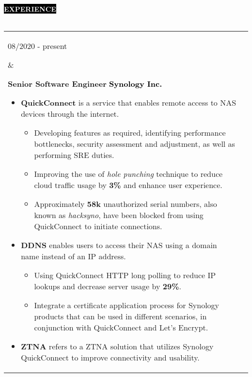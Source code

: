 \documentclass[10pt,A4]{article}
\makeatletter
\newcounter{a}
\newcounter{b}
\newcounter{c}
\newcommand{\cvsection}[1] {
	\textcolor{white}{\MakeUppercase{\textbf{#1}}}
}
\newcommand{\cvsect}[1]{
	\colorbox{black}{{\cvsection{#1}}}\\\\%
}
\newenvironment{entrylist}{%
	\begin{tabular*}{\textwidth}[t]{@{\extracolsep{\fill}}ll}
	}{%
	\end{tabular*}
}
\newcommand{\entry}[4]{%
	\parbox[t]{3.5cm}{%
		#1%
	}%
	&\parbox[t]{14cm}{%
		\textbf{#2}%
		\hfill%
		{\footnotesize \textbf{\textcolor{black}{#3}}}\\%
		#4%
	}\\\\}
\makeatother
\begin{document}
	\cvsect{Experience}\nobreak
	\begin{entrylist}
		\entry
		{08/2020 - present}
		{Senior Software Engineer}
		{Synology Inc.}
		{
				\begin{itemize}[leftmargin=*]
					\vspace{-0.5\baselineskip}
					\item \textbf{QuickConnect} \small is a service that enables remote access to NAS devices through the internet.\\
					\begin{itemize}\normalsize
						\vspace{-1\baselineskip}
						\item Developing features as required, identifying performance bottlenecks, security assessment and adjustment, as well as performing SRE duties.
						\item Improving the use of \textit{hole punching} technique to reduce cloud traffic usage by \textbf{3\%} and enhance user experience.
						\item Approximately \textbf{58k} unauthorized serial numbers, also known as \textit{hacksyno}, have been blocked from using QuickConnect to initiate connections.
					\end{itemize}
					\item \textbf{DDNS} \small enables users to access their NAS using a domain name instead of an IP address.\\
					\begin{itemize}\normalsize
						\vspace{-1\baselineskip}
						\item Using QuickConnect HTTP long polling to reduce IP lookups and decrease server usage by \textbf{29\%}.
						\item Integrate a certificate application process for Synology products that can be used in different scenarios, in conjunction with QuickConnect and Let's Encrypt.
					\end{itemize}
					\item \textbf{ZTNA} \small refers to a ZTNA solution that utilizes Synology QuickConnect to improve connectivity and usability.\\
					\begin{itemize}\normalsize
						\vspace{-1\baselineskip}

\end{itemize}
\end{itemize}}
\end{entrylist}
\end{document}
